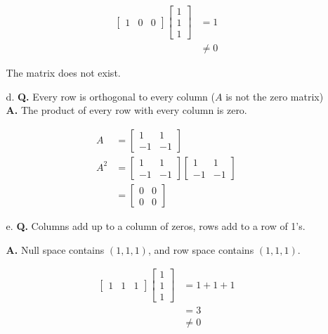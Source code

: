 \documentclass[main.tex]{subfiles}
\begin{document}
\begin{enumerate}
\begin{enumerate}
        $$
        \begin{aligned}
        {\left[\begin{array}{lll}
        1 & 0 & 0
        \end{array}\right]\left[\begin{array}{l}
        1 \\
        1 \\
        1
        \end{array}\right] } &=1 \\
        & \neq 0
        \end{aligned}
        $$
        
        The matrix does not exist.
        
        \item [d.] \textbf{Q.} Every row is orthogonal to every column ($A$ is not the zero matrix) \textbf{A.} The product of every row with every column is zero. 
        
        $$
        \begin{aligned}
        A &=\left[\begin{array}{cc}
        1 & 1 \\
        -1 & -1
        \end{array}\right]\\
        A^{2} &=\left[\begin{array}{cc}
        1 & 1 \\
        -1 & -1
        \end{array}\right]\left[\begin{array}{cc}
        1 & 1 \\
        -1 & -1
        \end{array}\right] \\
        &=\left[\begin{array}{ll}
        0 & 0 \\
        0 & 0
        \end{array}\right]
        \end{aligned}
        $$
        
        \item [e.] \textbf{Q.} Columns add up to a column of zeros, rows add to a row of 1's. 
        
        \textbf{A.} Null space contains $(1,1,1)$, and row space contains $(1,1,1)$.
        
        $$
        \begin{aligned}
        {\left[\begin{array}{lll}
        1 & 1 & 1
        \end{array}\right]\left[\begin{array}{l}
        1 \\
        1 \\
        1
        \end{array}\right] } &=1+1+1 \\
        &=3 \\
        & \neq 0
        \end{aligned}
        $$
        

\end{enumerate}
\end{enumerate}
\end{document}
